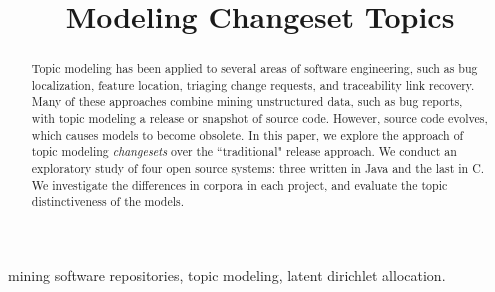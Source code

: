 \documentclass[conference]{IEEEtran}
\begin{document}
\title{Modeling Changeset Topics}
\author{

    \and


    \and

}


\maketitle

\begin{abstract}

Topic modeling has been applied to several areas of software engineering,
such as bug localization, feature location, triaging change requests,
and traceability link recovery.
Many of these approaches combine mining unstructured data, such as bug
reports, with topic modeling a release or snapshot of source code.
However, source code evolves, which causes models to become obsolete.
In this paper, we explore the approach of topic modeling \emph{changesets}
over the ``traditional" release approach.
We conduct an exploratory study of four open source systems:
three written in Java and the last in C.
We investigate the differences in corpora in each project,
and evaluate the topic distinctiveness of the models.

\end{abstract}

\begin{IEEEkeywords}
mining software repositories,
topic modeling,
latent dirichlet allocation.
\end{IEEEkeywords}
\end{document}
